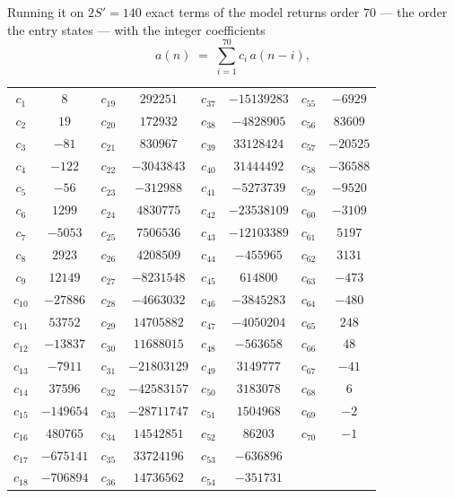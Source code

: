 \documentclass[11pt,a4paper]{article}
\theoremstyle{plain}
\theoremstyle{definition}
\begin{document}
Running it on $2S'=140$ exact terms of the model returns order $70$ --- the order the
entry states --- with the integer coefficients
\[
a(n)\;=\;\sum_{i=1}^{70}c_i\,a(n-i),
\]
\begin{center}\small
\begin{tabular}{cccccccc}
$c_{1}$ & $8$ & $c_{19}$ & $292251$ & $c_{37}$ & $-15139283$ & $c_{55}$ & $-6929$ \\
$c_{2}$ & $19$ & $c_{20}$ & $172932$ & $c_{38}$ & $-4828905$ & $c_{56}$ & $83609$ \\
$c_{3}$ & $-81$ & $c_{21}$ & $830967$ & $c_{39}$ & $33128424$ & $c_{57}$ & $-20525$ \\
$c_{4}$ & $-122$ & $c_{22}$ & $-3043843$ & $c_{40}$ & $31444492$ & $c_{58}$ & $-36588$ \\
$c_{5}$ & $-56$ & $c_{23}$ & $-312988$ & $c_{41}$ & $-5273739$ & $c_{59}$ & $-9520$ \\
$c_{6}$ & $1299$ & $c_{24}$ & $4830775$ & $c_{42}$ & $-23538109$ & $c_{60}$ & $-3109$ \\
$c_{7}$ & $-5053$ & $c_{25}$ & $7506536$ & $c_{43}$ & $-12103389$ & $c_{61}$ & $5197$ \\
$c_{8}$ & $2923$ & $c_{26}$ & $4208509$ & $c_{44}$ & $-455965$ & $c_{62}$ & $3131$ \\
$c_{9}$ & $12149$ & $c_{27}$ & $-8231548$ & $c_{45}$ & $614800$ & $c_{63}$ & $-473$ \\
$c_{10}$ & $-27886$ & $c_{28}$ & $-4663032$ & $c_{46}$ & $-3845283$ & $c_{64}$ & $-480$ \\
$c_{11}$ & $53752$ & $c_{29}$ & $14705882$ & $c_{47}$ & $-4050204$ & $c_{65}$ & $248$ \\
$c_{12}$ & $-13837$ & $c_{30}$ & $11688015$ & $c_{48}$ & $-563658$ & $c_{66}$ & $48$ \\
$c_{13}$ & $-7911$ & $c_{31}$ & $-21803129$ & $c_{49}$ & $3149777$ & $c_{67}$ & $-41$ \\
$c_{14}$ & $37596$ & $c_{32}$ & $-42583157$ & $c_{50}$ & $3183078$ & $c_{68}$ & $6$ \\
$c_{15}$ & $-149654$ & $c_{33}$ & $-28711747$ & $c_{51}$ & $1504968$ & $c_{69}$ & $-2$ \\
$c_{16}$ & $480765$ & $c_{34}$ & $14542851$ & $c_{52}$ & $86203$ & $c_{70}$ & $-1$ \\
$c_{17}$ & $-675141$ & $c_{35}$ & $33724196$ & $c_{53}$ & $-636896$ &  &  \\
$c_{18}$ & $-706894$ & $c_{36}$ & $14736562$ & $c_{54}$ & $-351731$ &  &  \\
\end{tabular}
\end{center}
\end{document}
